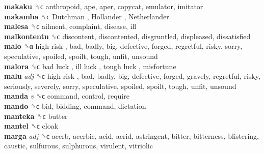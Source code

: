 \textbf{makaku} ␝ϲ  anthropoid, ape, aper, copycat, emulator, imitator  \\
\textbf{makamba} ␝ϲ   Dutchman ,  Hollander ,  Netherlander   \\
\textbf{malesa} ␝ϲ  ailment, complaint, disease, ill  \\
\textbf{malkontentu} ␝ϲ  discontent, discontented, disgruntled, displeased, dissatisfied  \\
\textbf{malo} ␝α   high-risk , bad, badly, big, defective, forged, regretful, risky, sorry, speculative, spoiled, spoilt, tough, unfit, unsound  \\
\textbf{malora} ␝ϲ   bad luck ,  ill luck ,  tough luck , misfortune  \\
\textbf{malu} \emph{adj}  ␝ϲ   high-risk , bad, badly, big, defective, forged, gravely, regretful, risky, seriously, severely, sorry, speculative, spoiled, spoilt, tough, unfit, unsound  \\
\textbf{manda} \emph{v}  ␝ϲ  command, control, require  \\
\textbf{mando} ␝ϲ  bid, bidding, command, dictation  \\
\textbf{manteka} ␝ϲ  butter  \\
\textbf{mantel} ␝ϲ  cloak  \\
\textbf{marga} \emph{adj}  ␝ϲ  acerb, acerbic, acid, acrid, astringent, bitter, bitterness, blistering, caustic, sulfurous, sulphurous, virulent, vitriolic  \\
